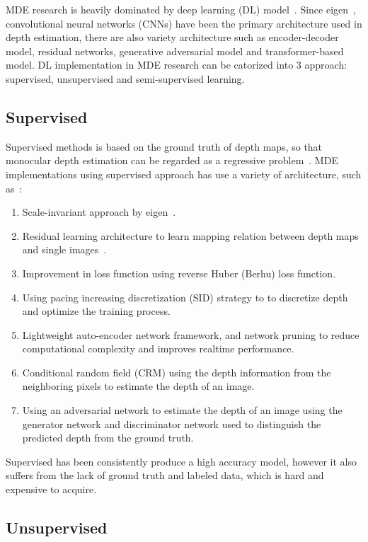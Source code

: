 \documentclass[a4paper,10pt]{article}
\begin{document}
MDE research is heavily dominated by deep learning (DL) model~\cite{Masoumian2022MDEReview}. Since eigen~\cite{eigen14062283}, convolutional neural networks (CNNs) have been the primary architecture used in depth estimation, there are also variety architecture such as encoder-decoder model, residual networks, generative adversarial model and transformer-based model.
DL implementation in MDE research can be catorized into 3 approach: supervised, unsupervised and semi-supervised learning.

\subsection{Supervised}

Supervised methods is based on the ground truth of depth maps, so that monocular depth estimation can be regarded as a regressive problem~\cite{Zhao2020MDEDLOverview}.
MDE implementations using supervised approach has use a variety of architecture, such as~\cite{Zhao2020MDEDLOverview}:
\begin{enumerate}
        \item Scale-invariant approach by eigen~\cite{eigen14062283}.
        \item Residual learning architecture to learn mapping relation between depth maps and single images~\cite{Zhao2020MDEDLOverview}.
        \item Improvement in loss function using reverse Huber (Berhu) loss function.
        \item Using pacing increasing discretization (SID) strategy to to discretize depth and optimize the training process.
        \item Lightweight auto-encoder network framework, and network pruning to reduce computational complexity and improves realtime performance.
        \item Conditional random field (CRM) using the depth information from the neighboring pixels to estimate the depth of an image.
        \item Using an adversarial network to estimate the depth of an image using the generator network and discriminator network used to distinguish the predicted depth from the ground truth. 
\end{enumerate}

Supervised has been consistently produce a high accuracy model, however it also suffers from the lack of ground truth and labeled data, which is hard and expensive to acquire.

\subsection{Unsupervised}
\end{document}
